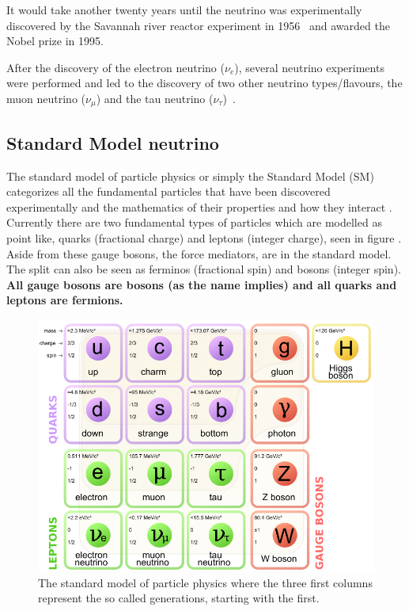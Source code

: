 It would take another twenty years until the neutrino was experimentally discovered by the Savannah river reactor experiment in 1956~\cite{6Reines} and awarded the Nobel prize in 1995.

After the discovery of the electron neutrino ($\nu_e$), several neutrino experiments were performed and led to the discovery of two other neutrino types/flavours, the muon neutrino ($\nu_\mu$) and the tau neutrino ($\nu_\tau$)~\cite{7Danby, 8Perl, Fix1}.

\subsection{Standard Model neutrino}\label{subsection:SMN}
The standard model of particle physics or simply the Standard Model (SM) categorizes all the fundamental particles that have been discovered experimentally and the mathematics of their properties and how they interact \cite{32Burchan:1995}. Currently there are two fundamental types of particles which are modelled as point like, quarks (fractional charge) and leptons (integer charge), seen in figure . Aside from these gauge bosons, the force mediators, are in the standard model. The split can also be seen as ferminos (fractional spin) and bosons (integer spin). \textbf{All gauge bosons are bosons (as the name implies) and all quarks and leptons are fermions.}

\begin{figure}[h!]
\includegraphics[width=\textwidth]{figures/Standard_Model_of_Elementary_Particles.png}
\caption{The standard model of particle physics where the three first columns represent the so called generations, starting with the first. \cite{33wiki1:Online}}
 \label{fig:standardModel}
\end{figure}

